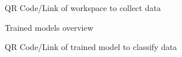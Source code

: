 \begin{figure}[!htb]
    \centering
    \caption{QR Code/Link of workspace to collect data}
    \label{fig:workspace-link}
\end{figure}

\begin{figure}[!htb]
    \centering
    \caption{Trained models overview}
    \label{fig:models-overview}
\end{figure}

\begin{figure}[!htb]
    \centering
    \caption{QR Code/Link of trained model to classify data}
    \label{fig:model-link}
\end{figure}

